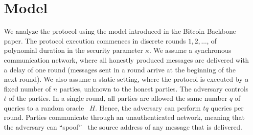 \section{Model}

We analyze the protocol using the model introduced in the Bitcoin Backbone~\cite{backbone} paper.
The protocol execution commences in discrete rounds $1, 2, \ldots$, of polynomial duration in the
security parameter $\kappa$.
We assume a synchronous communication network, where all honestly produced
messages are delivered with a delay of one round (messages sent in a round
arrive at the beginning of the next round).
We also assume a static setting, where the protocol is executed by
a fixed number of $n$ parties, unknown to the honest parties.
The adversary controls $t$ of the parties.
In a single round, all parties are allowed the same number $q$ of queries to
a random oracle~\cite{ro} $H$. Hence, the adversary can perform $t q$ queries
per round.
Parties communicate through an unauthenticated network,
meaning that the adversary can ``spoof''~\cite{douceur2002sybil}
the source address of any message that is delivered.
